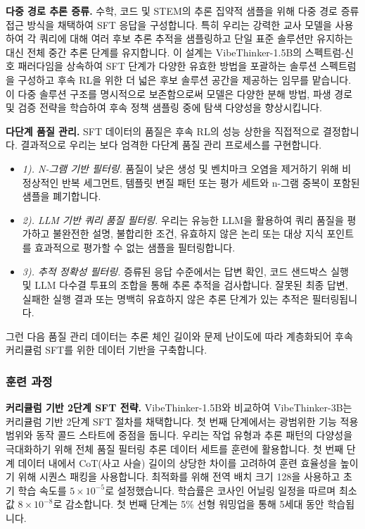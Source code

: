 \documentclass{article}
\begin{document}
\textbf{다중 경로 추론 증류.} 수학, 코드 및 STEM의 추론 집약적 샘플을 위해 다중 경로 증류 접근 방식을 채택하여 SFT 응답을 구성합니다. 특히 우리는 강력한 교사 모델을 사용하여 각 쿼리에 대해 여러 후보 추론 추적을 샘플링하고 단일 표준 솔루션만 유지하는 대신 전체 중간 추론 단계를 유지합니다. 이 설계는 VibeThinker-1.5B의 스펙트럼-신호 패러다임을 상속하여 SFT 단계가 다양한 유효한 방법을 포괄하는 솔루션 스펙트럼을 구성하고 후속 RL을 위한 더 넓은 후보 솔루션 공간을 제공하는 임무를 맡습니다. 이 다중 솔루션 구조를 명시적으로 보존함으로써 모델은 다양한 분해 방법, 파생 경로 및 검증 전략을 학습하여 후속 정책 샘플링 중에 탐색 다양성을 향상시킵니다.

\textbf{다단계 품질 관리.} SFT 데이터의 품질은 후속 RL의 성능 상한을 직접적으로 결정합니다. 결과적으로 우리는 보다 엄격한 다단계 품질 관리 프로세스를 구현합니다.
\begin{itemize}
\item \textit{1). N-그램 기반 필터링.} 품질이 낮은 생성 및 벤치마크 오염을 제거하기 위해 비정상적인 반복 세그먼트, 템플릿 변질 패턴 또는 평가 세트와 n-그램 중복이 포함된 샘플을 폐기합니다.
\item \textit{2). LLM 기반 쿼리 품질 필터링.} 우리는 유능한 LLM을 활용하여 쿼리 품질을 평가하고 불완전한 설명, 불합리한 조건, 유효하지 않은 논리 또는 대상 지식 포인트를 효과적으로 평가할 수 없는 샘플을 필터링합니다.
\item \textit{3). 추적 정확성 필터링.} 증류된 응답 수준에서는 답변 확인, 코드 샌드박스 실행 및 LLM 다수결 투표의 조합을 통해 추론 추적을 검사합니다. 잘못된 최종 답변, 실패한 실행 결과 또는 명백히 유효하지 않은 추론 단계가 있는 추적은 필터링됩니다.
\end{itemize}
그런 다음 품질 관리 데이터는 추론 체인 길이와 문제 난이도에 따라 계층화되어 후속 커리큘럼 SFT를 위한 데이터 기반을 구축합니다.

\subsubsection{훈련 과정}

\textbf{커리큘럼 기반 2단계 SFT 전략.} VibeThinker-1.5B와 비교하여 VibeThinker-3B는 커리큘럼 기반 2단계 SFT 절차를 채택합니다. 첫 번째 단계에서는 광범위한 기능 적용 범위와 동작 콜드 스타트에 중점을 둡니다. 우리는 작업 유형과 추론 패턴의 다양성을 극대화하기 위해 전체 품질 필터링 추론 데이터 세트를 훈련에 활용합니다. 첫 번째 단계 데이터 내에서 CoT(사고 사슬) 길이의 상당한 차이를 고려하여 훈련 효율성을 높이기 위해 시퀀스 패킹을 사용합니다. 최적화를 위해 전역 배치 크기 128을 사용하고 초기 학습 속도를 $5\times10^{-5}$로 설정했습니다. 학습률은 코사인 어닐링 일정을 따르며 최소값 $8\times10^{-8}$로 감소합니다. 첫 번째 단계는 5\% 선형 워밍업을 통해 5세대 동안 학습됩니다.
\end{document}
